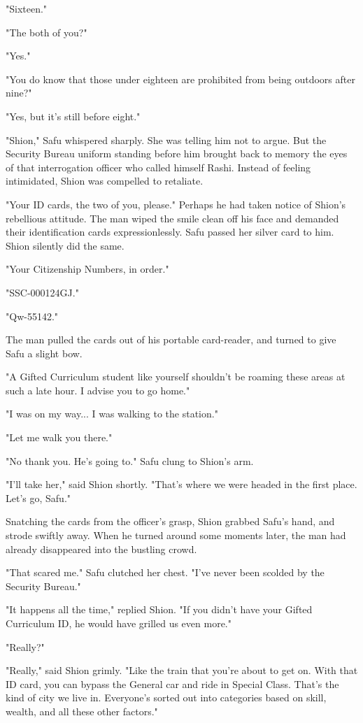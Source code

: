 "Sixteen."

"The both of you?"

"Yes."

"You do know that those under eighteen are prohibited from being
outdoors after nine?"

"Yes, but it's still before eight."

"Shion," Safu whispered sharply. She was telling him not to argue. But
the Security Bureau uniform standing before him brought back to memory
the eyes of that interrogation officer who called himself Rashi. Instead
of feeling intimidated, Shion was compelled to retaliate.

"Your ID cards, the two of you, please." Perhaps he had taken notice of
Shion's rebellious attitude. The man wiped the smile clean off his face
and demanded their identification cards expressionlessly. Safu passed
her silver card to him. Shion silently did the same.

"Your Citizenship Numbers, in order."

"SSC-000124GJ."

"Qw-55142."

The man pulled the cards out of his portable card-reader, and turned to
give Safu a slight bow.

"A Gifted Curriculum student like yourself shouldn't be roaming these
areas at such a late hour. I advise you to go home."

"I was on my way... I was walking to the station."

"Let me walk you there."

"No thank you. He's going to." Safu clung to Shion's arm.

"I'll take her," said Shion shortly. "That's where we were headed in the
first place. Let's go, Safu."

Snatching the cards from the officer's grasp, Shion grabbed Safu's hand,
and strode swiftly away. When he turned around some moments later, the
man had already disappeared into the bustling crowd.

"That scared me." Safu clutched her chest. "I've never been scolded by
the Security Bureau."~

"It happens all the time," replied Shion. "If you didn't have your
Gifted Curriculum ID, he would have grilled us even more."

"Really?"

"Really," said Shion grimly. "Like the train that you're about to get
on. With that ID card, you can bypass the General car and ride in
Special Class. That's the kind of city we live in. Everyone's sorted out
into categories based on skill, wealth, and all these other factors."

